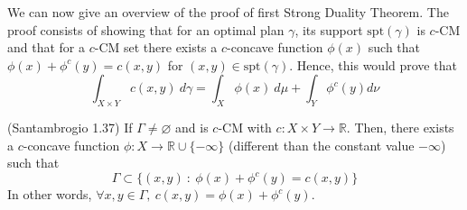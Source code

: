 We can now give an overview of the proof
of first Strong Duality Theorem. The proof consists of showing
that for an optimal
plan $\gamma$, its support $\text{spt} (\gamma)$ is $c$-CM and
that for a $c$-CM set there exists a $c$-concave function
$\phi(x)$ such that $\phi(x)+\phi^c(y) = c(x,y)$ for
$(x,y) \in \text{spt}(\gamma)$. Hence, this would prove that
\begin{equation}
  \int_{X\times Y} c(x,y) \ d\gamma = \int_X \phi(x)\ d\mu + \int_Y \phi^c(y)d\nu
\end{equation}

\begin{theorem}(Santambrogio 1.37)
  If $\Gamma \neq \varnothing $ and is $c$-CM with
  $c:X\times Y \to \mathbb R$. Then,
  there exists a $c$-concave function
  $\phi:X \to \mathbb R \cup \{-\infty\}$ (different than the constant value $-\infty$) such that
  \begin{equation}
    \Gamma \subset \{
    (x,y) \ : \ \phi(x)+\phi^c(y) = c(x,y)
    \}
  \end{equation}
  In other words,
  $\forall x,y \in \Gamma, \ c(x,y) = \phi(x) + \phi^c(y)$.
  \label{thm:existsPhic}
\end{theorem}


